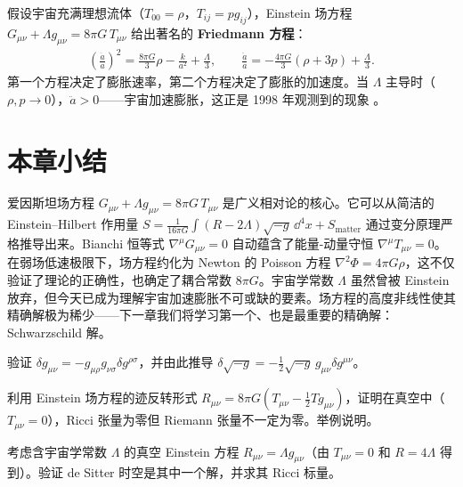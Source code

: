 \begin{example}
假设宇宙充满理想流体（$T_{00} = \rho$，$T_{ij} = p g_{ij}$），Einstein 场方程 $G_{\mu\nu} + \Lambda g_{\mu\nu} = 8\pi G\,T_{\mu\nu}$ 给出著名的 \textbf{Friedmann 方程}：
\begin{align}
    \boxed{\left(\frac{\dot a}{a}\right)^2 = \frac{8\pi G}{3}\rho - \frac{k}{a^2} + \frac{\Lambda}{3}}, \qquad
    \boxed{\frac{\ddot a}{a} = -\frac{4\pi G}{3}(\rho + 3p) + \frac{\Lambda}{3}}.
\end{align}
第一个方程决定了膨胀速率，第二个方程决定了膨胀的加速度。当 $\Lambda$ 主导时（$\rho, p \to 0$），$\ddot a > 0$——宇宙加速膨胀，这正是 1998 年观测到的现象 \cite{Riess1998}。
\end{example}

\section*{本章小结}

爱因斯坦场方程 $G_{\mu\nu} + \Lambda g_{\mu\nu} = 8\pi G\,T_{\mu\nu}$ 是广义相对论的核心。它可以从简洁的 Einstein--Hilbert 作用量 $S = \frac{1}{16\pi G}\int (R-2\Lambda)\sqrt{-g}\,\dd^4 x + S_{\text{matter}}$ 通过变分原理严格推导出来。Bianchi 恒等式 $\nabla^\mu G_{\mu\nu} = 0$ 自动蕴含了能量-动量守恒 $\nabla^\mu T_{\mu\nu} = 0$。在弱场低速极限下，场方程约化为 Newton 的 Poisson 方程 $\nabla^2\Phi = 4\pi G\rho$，这不仅验证了理论的正确性，也确定了耦合常数 $8\pi G$。宇宙学常数 $\Lambda$ 虽然曾被 Einstein 放弃，但今天已成为理解宇宙加速膨胀不可或缺的要素。场方程的高度非线性使其精确解极为稀少——下一章我们将学习第一个、也是最重要的精确解：Schwarzschild 解。


\begin{exercise}
验证 $\delta g_{\mu\nu} = -g_{\mu\rho}g_{\nu\sigma}\delta g^{\rho\sigma}$，并由此推导 $\delta\sqrt{-g} = -\frac{1}{2}\sqrt{-g}\,g_{\mu\nu}\delta g^{\mu\nu}$。
\end{exercise}

\begin{exercise}
利用 Einstein 场方程的迹反转形式 $R_{\mu\nu} = 8\pi G(T_{\mu\nu} - \frac{1}{2}T g_{\mu\nu})$，证明在真空中（$T_{\mu\nu} = 0$），Ricci 张量为零但 Riemann 张量不一定为零。举例说明。
\end{exercise}

\begin{exercise}
考虑含宇宙学常数 $\Lambda$ 的真空 Einstein 方程 $R_{\mu\nu} = \Lambda g_{\mu\nu}$（由 $T_{\mu\nu}=0$ 和 $R = 4\Lambda$ 得到）。验证 de Sitter 时空是其中一个解，并求其 Ricci 标量。
\end{exercise}

